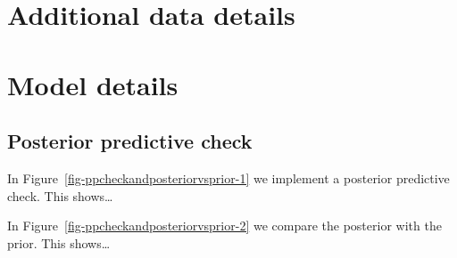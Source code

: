 \documentclass[
  letterpaper,
  DIV=11,
  numbers=noendperiod]{scrartcl}
\begin{document}
\hypertarget{additional-data-details}{%
\section{Additional data details}\label{additional-data-details}}

\hypertarget{sec-model-details}{%
\section{Model details}\label{sec-model-details}}

\hypertarget{posterior-predictive-check}{%
\subsection{Posterior predictive
check}\label{posterior-predictive-check}}

In Figure~\ref{fig-ppcheckandposteriorvsprior-1} we implement a
posterior predictive check. This shows\ldots{}

In Figure~\ref{fig-ppcheckandposteriorvsprior-2} we compare the
posterior with the prior. This shows\ldots{}
\end{document}
